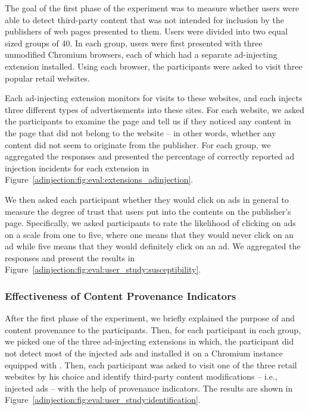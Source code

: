 The goal of the first phase of the experiment was to measure whether users were
able to detect third-party content that was not intended for inclusion by the
publishers of web pages presented to them. Users were divided into two equal
sized groups of 40. In each group, users were first presented with three
unmodified Chromium browsers, each of which had a separate ad-injecting
extension installed. Using each browser, the participants were asked to visit
three popular retail websites.

Each ad-injecting extension monitors for visits to these websites, and each
injects three different types of advertisements into these sites. For each
website, we asked the participants to examine the page and tell us if they
noticed any content in the page that did not belong to the website -- in other
words, whether any content did not seem to originate from the publisher. For
each group, we aggregated the responses and presented the percentage of
correctly reported ad injection incidents for each extension in
Figure~\ref{adinjection:fig:eval:extensions_adinjection}.

We then asked each participant whether they would click on ads in general to
measure the degree of trust that users put into the contents on the publisher's
page. Specifically, we asked participants to rate the likelihood of clicking on
ads on a scale from one to five, where one means that they would never click on
an ad while five means that they would definitely click on an ad. We aggregated
the responses and present the results in
Figure~\ref{adinjection:fig:eval:user_study:susceptibility}.



\subsubsection{Effectiveness of Content Provenance Indicators}
\label{adinjection:sec:analysis:effectiveness}

After the first phase of the experiment, we briefly explained the purpose of
\origintracer and content provenance to the participants. Then, for each
participant in each group, we picked one of the three ad-injecting extensions in
which, the participant did not detect most of the injected ads and installed it
on a Chromium instance equipped with \origintracer. Then, each participant was
asked to visit one of the three retail websites by his choice and identify
third-party content modifications -- i.e., injected ads -- with the help of
provenance indicators. The results are shown in
Figure~\ref{adinjection:fig:eval:user_study:identification}.

